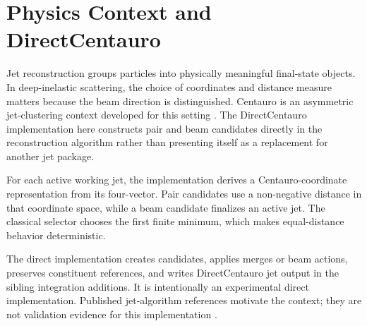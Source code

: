 \section{Physics Context and DirectCentauro}
Jet reconstruction groups particles into physically meaningful final-state objects. In deep-inelastic scattering, the choice of coordinates and distance measure matters because the beam direction is distinguished. Centauro is an asymmetric jet-clustering context developed for this setting \cite{Arratia2021}. The DirectCentauro implementation here constructs pair and beam candidates directly in the reconstruction algorithm rather than presenting itself as a replacement for another jet package.

For each active working jet, the implementation derives a Centauro-coordinate representation from its four-vector. Pair candidates use a non-negative distance in that coordinate space, while a beam candidate finalizes an active jet. The classical selector chooses the first finite minimum, which makes equal-distance behavior deterministic.


\measured The direct implementation creates candidates, applies merges or beam actions, preserves constituent references, and writes DirectCentauro jet output in the sibling integration additions. It is intentionally an experimental direct implementation. Published jet-algorithm references motivate the context; they are not validation evidence for this implementation \cite{Cacciari2012,Arratia2021}.
\clearpage
